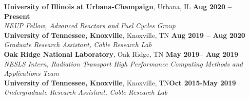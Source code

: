 \documentclass[margin,line]{resume}
\begin{document}
\begin{resume}
    \textbf{University of Illinois at Urbana-Champaign}, Urbana, IL \hfill \textbf{Aug 2020 -- Present} \\
    \vspace{-5mm}
        \textsl{NEUP Fellow, Advanced Reactors and Fuel Cycles Group} \\
        
    \textbf{University of Tennessee, Knoxville}, Knoxville, TN \hfill \textbf{Aug 2019 -- Aug 2020}\\
    \vspace{-5mm}
        \textsl{Graduate Research Assistant, Coble Research Lab} \\ 
    
    \textbf{Oak Ridge National Laboratory}, Oak Ridge, TN \hfill \textbf{May 2019-- Aug 2019}\\
    \vspace{-5mm}        
        \textsl{NESLS Intern, Radiation Transport High Performance Computing Methods and Applications Team}\\               
    
    \textbf{University of Tennessee, Knoxville}, Knoxville, TN\hfill\textbf{Oct 2015-May 2019}\\
        \vspace{-5mm}            
        \textsl{Undergraduate Research Assistant, Coble Research Lab}\\

    


\end{resume}
\end{document}
